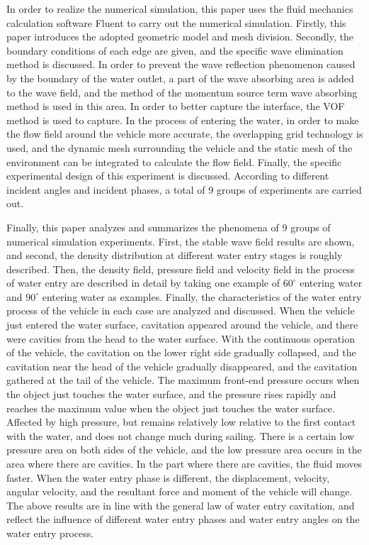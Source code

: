 \begin{digest}
    In order to realize the numerical simulation, this paper uses the fluid mechanics calculation software Fluent to carry out the numerical simulation. Firstly, this paper introduces the adopted geometric model and mesh division. Secondly, the boundary conditions of each edge are given, and the specific wave elimination method is discussed. In order to prevent the wave reflection phenomenon caused by the boundary of the water outlet, a part of the wave absorbing area is added to the wave field, and the method of the momentum source term wave absorbing method is used in this area. In order to better capture the interface, the VOF method is used to capture. In the process of entering the water, in order to make the flow field around the vehicle more accurate, the overlapping grid technology is used, and the dynamic mesh surrounding the vehicle and the static mesh of the environment can be integrated to calculate the flow field. Finally, the specific experimental design of this experiment is discussed. According to different incident angles and incident phases, a total of 9 groups of experiments are carried out.
  
    Finally, this paper analyzes and summarizes the phenomena of 9 groups of numerical simulation experiments. First, the stable wave field results are shown, and second, the density distribution at different water entry stages is roughly described. Then, the density field, pressure field and velocity field in the process of water entry are described in detail by taking one example of $60 ^\circ$ entering water and $90 ^\circ$ entering water as examples. Finally, the characteristics of the water entry process of the vehicle in each case are analyzed and discussed. When the vehicle just entered the water surface, cavitation appeared around the vehicle, and there were cavities from the head to the water surface. With the continuous operation of the vehicle, the cavitation on the lower right side gradually collapsed, and the cavitation near the head of the vehicle gradually disappeared, and the cavitation gathered at the tail of the vehicle. The maximum front-end pressure occurs when the object just touches the water surface, and the pressure rises rapidly and reaches the maximum value when the object just touches the water surface. Affected by high pressure, but remains relatively low relative to the first contact with the water, and does not change much during sailing. There is a certain low pressure area on both sides of the vehicle, and the low pressure area occurs in the area where there are cavities. In the part where there are cavities, the fluid moves faster. When the water entry phase is different, the displacement, velocity, angular velocity, and the resultant force and moment of the vehicle will change. The above results are in line with the general law of water entry cavitation, and reflect the influence of different water entry phases and water entry angles on the water entry process.
\end{digest}
